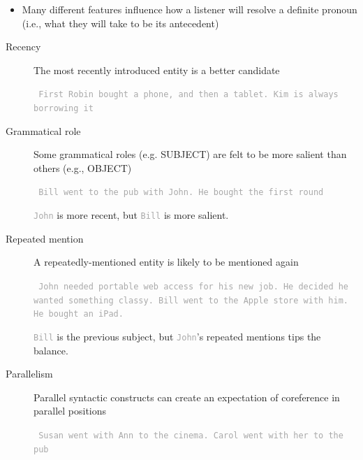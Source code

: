 \documentclass[landscape]{jhuslides3C}
\begin{document}

\vfill
\begin{itemize}
\item Many different features influence how a listener will resolve a definite pronoun (i.e., what they
will take to be its antecedent)
\end{itemize}
\begin{description}
\item[Recency]
The most recently introduced entity is a better candidate
\textcolor{darkgrey}{\begin{flushleft} \tt
 First Robin bought a phone, and then a tablet. Kim is always borrowing it\pause
\end{flushleft}}
\item[Grammatical role]
Some grammatical roles (e.g. SUBJECT) are felt to be more salient than others (e.g.,
OBJECT)
\textcolor{darkgrey}{\begin{flushleft} \tt
Bill went to the pub with John. He bought the first round
\end{flushleft}}
\textcolor{darkgrey}{\tt John} is more recent, but \textcolor{darkgrey}{\tt Bill} is more salient.
\end{description}
\vfill


\vfill
\begin{description}
\item[Repeated mention]
A repeatedly-mentioned entity is likely to be mentioned again
\textcolor{darkgrey}{\begin{flushleft} \tt
John needed portable web access for his new job. He decided he wanted
something classy. Bill went to the Apple store with him. He bought an
iPad.
\end{flushleft}}
\textcolor{darkgrey}{\tt Bill} is the previous subject, but \textcolor{darkgrey}{\tt John}'s repeated mentions tips the balance.\pause
\item[Parallelism]
Parallel syntactic constructs can create an expectation of coreference in parallel positions
\textcolor{darkgrey}{\begin{flushleft} \tt
Susan went with Ann to the cinema. Carol went with her to the pub
\end{flushleft}}
\end{description}
\vfill
\end{document}
